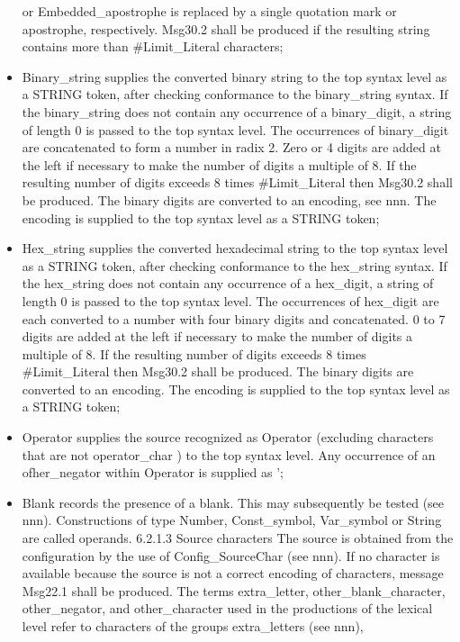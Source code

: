 \begin{itemize}
  or Embedded\_apostrophe is replaced by a single quotation mark or
  apostrophe, respectively. Msg30.2 shall be produced if the resulting
  string contains more than \#Limit\_Literal characters;
\item
  Binary\_string supplies the converted binary string to the top syntax
  level as a STRING token, after checking conformance to the
  binary\_string syntax. If the binary\_string does not contain any
  occurrence of a binary\_digit, a string of length 0 is passed to the
  top syntax level. The occurrences of binary\_digit are concatenated to
  form a number in radix 2. Zero or 4 digits are added at the left if
  necessary to make the number of digits a multiple of 8. If the
  resulting number of digits exceeds 8 times \#Limit\_Literal then
  Msg30.2 shall be produced. The binary digits are converted to an
  encoding, see nnn. The encoding is supplied to the top syntax level as
  a STRING token;
\item
  Hex\_string supplies the converted hexadecimal string to the top
  syntax level as a STRING token, after checking conformance to the
  hex\_string syntax. If the hex\_string does not contain any occurrence
  of a hex\_digit, a string of length 0 is passed to the top syntax
  level. The occurrences of hex\_digit are each converted to a number
  with four binary digits and concatenated. 0 to 7 digits are added at
  the left if necessary to make the number of digits a multiple of 8. If
  the resulting number of digits exceeds 8 times \#Limit\_Literal then
  Msg30.2 shall be produced. The binary digits are converted to an
  encoding. The encoding is supplied to the top syntax level as a STRING
  token;
\item
  Operator supplies the source recognized as Operator (excluding
  characters that are not operator\_char ) to the top syntax level. Any
  occurrence of an ofher\_negator within Operator is supplied as
  '\textquotesingle;
\item
  Blank records the presence of a blank. This may subsequently be tested
  (see nnn). Constructions of type Number, Const\_symbol, Var\_symbol or
  String are called operands. 6.2.1.3 Source characters The source is
  obtained from the configuration by the use of Config\_SourceChar (see
  nnn). If no character is available because the source is not a correct
  encoding of characters, message Msg22.1 shall be produced. The terms
  extra\_letter, other\_blank\_character, other\_negator, and
  other\_character used in the productions of the lexical level refer to
  characters of the groups extra\_letters (see nnn),
\end{itemize}

